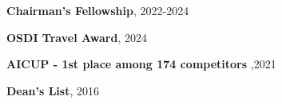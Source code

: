 
\begin{zitemize}
    \item \textbf{Chairman's Fellowship}, 2022-2024
    \item \textbf{OSDI Travel Award}, 2024
    \item \textbf{AICUP - 1st place among 174 competitors },2021
    \item \textbf{Dean's List}, 2016
\end{zitemize}
